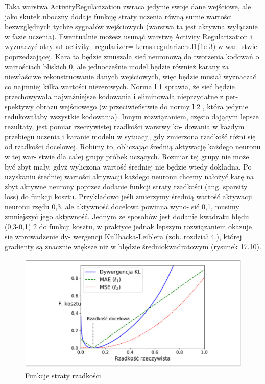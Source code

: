 \documentclass[12pt]{mwbk}
\theoremstyle{plain}
\theoremstyle{definition}
\theoremstyle{remark}
\newcommand\zrodlo[1]{\par\vspace{-3mm}{\small\textit{Źródło: }#1 }}
\begin{document}
Taka warstwa ActivityRegularization zwraca jedynie swoje dane wejściowe, ale jako skutek uboczny
dodaje funkcję straty uczenia równą sumie wartości bezwzględnych tychże sygnałów wejściowych
(warstwa ta jest aktywna wyłącznie w fazie uczenia). Ewentualnie możesz usunąć warstwę Activity
Regularization i wyznaczyć atrybut activity\_regularizer= keras.regularizers.l1(1e-3) w war-
stwie poprzedzającej. Kara ta będzie zmuszała sieć neuronową do tworzenia kodowań o wartościach
bliskich 0, ale jednocześnie model będzie również karany za niewłaściwe rekonstruowanie danych
wejściowych, więc będzie musiał wyznaczać co najmniej kilka wartości niezerowych. Norma l 1
sprawia, że sieć będzie przechowywała najważniejsze kodowania i eliminowała nieprzydatne z per-
spektywy obrazu wejściowego (w przeciwieństwie do normy l 2 , która jedynie redukowałaby wszystkie
kodowania).
Innym rozwiązaniem, często dającym lepsze rezultaty, jest pomiar rzeczywistej rzadkości warstwy ko-
dowania w każdym przebiegu uczenia i karanie modelu w sytuacji, gdy zmierzona rzadkość różni
się od rzadkości docelowej. Robimy to, obliczając średnią aktywację każdego neuronu w tej war-
stwie dla całej grupy próbek uczących. Rozmiar tej grupy nie może być zbyt mały, gdyż wyliczona
wartość średniej nie będzie wtedy dokładna.
Po uzyskaniu średniej wartości aktywacji każdego neuronu chcemy nałożyć karę na zbyt aktywne
neurony poprzez dodanie funkcji straty rzadkości (ang. sparsity loss) do funkcji kosztu. Przykładowo
jeśli zmierzymy średnią wartość aktywacji neuronu rzędu 0,3, ale aktywność docelowa powinna wyno-
sić 0,1, musimy zmniejszyć jego aktywność. Jednym ze sposobów jest dodanie kwadratu błędu
(0,3-0,1) 2 do funkcji kosztu, w praktyce jednak lepszym rozwiązaniem okazuje się wprowadzenie dy-
wergencji Kullbacka-Leiblera (zob. rozdział 4.), której gradienty są znacznie większe niż w błędzie
średniokwadratowym (rysunek 17.10).
\begin{figure}[!h]
	\centering
	\includegraphics[width=\linewidth]{rys/funkcja_straty_rzadkosci.png}
	\caption{Funkcje straty rzadkości}
	\zrodlo{\cite{geron}}
	\label{fig:funkcja-straty-rzadkosci}
\end{figure}
\end{document}
